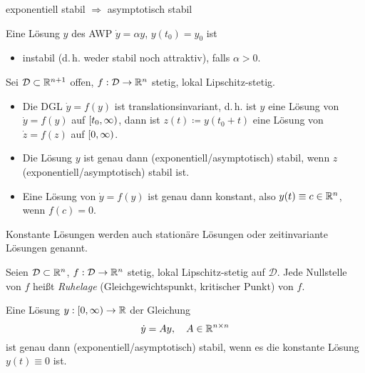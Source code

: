 \documentclass{cheat-sheet}
\newcommand{\D}{\mathcal{D}}
\begin{document}
\begin{bem}
  exponentiell stabil $\Rightarrow$ asymptotisch stabil
\end{bem}

\begin{bsp}
  Eine Lösung $y$ des AWP $\dot{y} = \alpha y$, $y(t_0) = y_0$ ist
  \begin{itemize}
    \item instabil (d.\,h. weder stabil noch attraktiv), falls $\alpha > 0$.
  \end{itemize}
\end{bsp}


\begin{satz}
  Sei $\D \subset \R^{n+1}$ offen, $f : \D \to \R^n$ stetig, lokal Lipschitz-stetig.
  \begin{itemize}
    \item Die DGL $\dot{y} = f(y)$ ist translationsinvariant, d.\,h. ist $y$ eine Lösung von $\dot{y} = f(y)$ auf $\left[ t_0, \infty \right)$, dann ist $z(t) \coloneqq y(t_0 + t)$ eine Lösung von $\dot{z} = f(z)$ auf $\left[ 0, \infty \right)$.
    \item Die Lösung $y$ ist genau dann (exponentiell/asymptotisch) stabil, wenn $z$ (exponentiell/asymptotisch) stabil ist.
    \item Eine Lösung von $\dot{y} = f(y)$ ist genau dann konstant, also $y(t) \equiv c \in \mathbb{R}^n$, wenn $f(c) = 0$.
  \end{itemize}
\end{satz}

\begin{sprech}
  Konstante Lösungen werden auch stationäre Lösungen oder zeitinvariante Lösungen genannt.
\end{sprech}

\begin{defn}
  Seien $\D \subset \R^n$, $f : \D \to \R^n$ stetig, lokal Lipschitz-stetig auf $\D$. Jede Nullstelle von $f$ heißt \emph{Ruhelage} (Gleichgewichtspunkt, kritischer Punkt) von $f$.
\end{defn}


\begin{bem}
  Eine Lösung $y : \left[ 0, \infty \right) \to \mathbb{R}$ der Gleichung
  \[ \dot{y} = A y, \quad A \in \mathbb{R}^{n \times n} \]
  ist genau dann (exponentiell/asymptotisch) stabil, wenn es die konstante Lösung $y(t) \equiv 0$ ist.
\end{bem}
\end{document}
